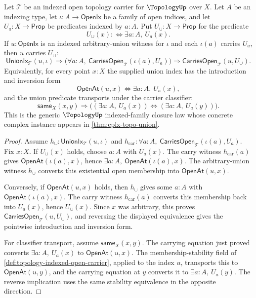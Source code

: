 \begin{theorem}
\label{thm:topology-indexed-open-arbitrary-union}
Let $\mathcal{T}$ be an indexed open topology carrier for $\TopologyUp$ over $X$. Let $A$ be an indexing type, let $\iota:A\to\mathsf{OpenIx}$ be a family of open indices, and let $U_a:X\to\mathsf{Prop}$ be predicates indexed by $a:A$. Put $U_{\cup}:X\to\mathsf{Prop}$ for the predicate
$$
U_{\cup}(x):\Longleftrightarrow \exists a:A,\ U_a(x).
$$
If $u:\mathsf{OpenIx}$ is an indexed arbitrary-union witness for $\iota$ and each $\iota(a)$ carries $U_a$, then $u$ carries $U_{\cup}$:
$$
\mathsf{UnionIx}_{\mathcal{T}}(u,\iota)
\Longrightarrow
\bigl(\forall a:A,\ \mathsf{CarriesOpen}_{\mathcal{T}}(\iota(a),U_a)\bigr)
\Longrightarrow
\mathsf{CarriesOpen}_{\mathcal{T}}(u,U_{\cup}).
$$
Equivalently, for every point $x:X$ the supplied union index has the introduction and inversion form
$$
\mathsf{OpenAt}(u,x)
\Longleftrightarrow
\exists a:A,\ U_a(x),
$$
and the union predicate transports under the carrier classifier:
$$
\mathsf{same}_X(x,y)
\Longrightarrow
\bigl((\exists a:A,\ U_a(x))\Longleftrightarrow(\exists a:A,\ U_a(y))\bigr).
$$
This is the generic $\TopologyUp$ indexed-family closure law whose concrete complex instance appears in \autoref{thm:cplx-topo-union}.
\end{theorem}
\begin{proof}
Assume $h_{\cup}:\mathsf{UnionIx}_{\mathcal{T}}(u,\iota)$ and $h_{\mathrm{car}}:\forall a:A,\ \mathsf{CarriesOpen}_{\mathcal{T}}(\iota(a),U_a)$. Fix $x:X$. If $U_{\cup}(x)$ holds, choose $a:A$ with $U_a(x)$. The carry witness $h_{\mathrm{car}}(a)$ gives $\mathsf{OpenAt}(\iota(a),x)$, hence $\exists a:A,\ \mathsf{OpenAt}(\iota(a),x)$. The arbitrary-union witness $h_{\cup}$ converts this existential open membership into $\mathsf{OpenAt}(u,x)$.

Conversely, if $\mathsf{OpenAt}(u,x)$ holds, then $h_{\cup}$ gives some $a:A$ with $\mathsf{OpenAt}(\iota(a),x)$. The carry witness $h_{\mathrm{car}}(a)$ converts this membership back into $U_a(x)$, hence $U_{\cup}(x)$. Since $x$ was arbitrary, this proves $\mathsf{CarriesOpen}_{\mathcal{T}}(u,U_{\cup})$, and reversing the displayed equivalence gives the pointwise introduction and inversion form.

For classifier transport, assume $\mathsf{same}_X(x,y)$. The carrying equation just proved converts $\exists a:A,\ U_a(x)$ to $\mathsf{OpenAt}(u,x)$. The membership-stability field of \autoref{def:topology-indexed-open-carrier}, applied to the index $u$, transports this to $\mathsf{OpenAt}(u,y)$, and the carrying equation at $y$ converts it to $\exists a:A,\ U_a(y)$. The reverse implication uses the same stability equivalence in the opposite direction.
\end{proof}

